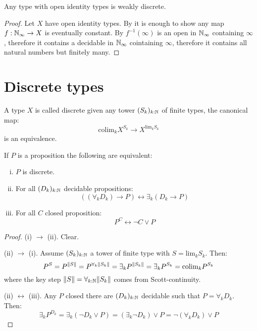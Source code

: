 \begin{lemma}
Any type with open identity types is weakly discrete.
\end{lemma}

\begin{proof}
Let $X$ have open identity types. By  it is enough to show any map $f:\mathbb{N}_{\infty}\to X$ is eventually constant. By $f^{-1}(\infty)$ is an open in $\mathbb{N}_{\infty}$ containing $\infty$, therefore it contains a decidable in $\mathbb{N}_{\infty}$ cointaining $\infty$, therefore it contains all natural numbers but finitely many.
\end{proof}


\section{Discrete types}

\begin{definition}
A type $X$ is called discrete given any tower $(S_k)_{k:\mathbb{N}}$ of finite types, the canonical map:
\[\mathrm{colim}_kX^{S_k} \to X^{\mathrm{lim}_kS_k}\]
is an equivalence.
\end{definition}

\begin{lemma}
If $P$ is a proposition the following are equivalent:
\begin{enumerate}[(i)]
\item $P$ is discrete.
\item For all $(D_k)_{k:\mathbb{N}}$ decidable propositions:
\[((\forall_kD_k)\to P) \leftrightarrow \exists_k(D_k\to P)\]
\item For all $C$ closed proposition:
\[P^C \leftrightarrow \neg C\lor P\]
\end{enumerate}
\end{lemma}

\begin{proof}
(i) $\to$ (ii). Clear.

(ii) $\to$ (i). Assume $(S_k)_{k:\mathbb{N}}$ a tower of finite type with $S=\mathrm{lim}_kS_k$. Then:
\[P^S = P^{\lVert S \rVert} = P^{\forall_{k}\lVert S_k \rVert} = \exists_{k} P^{\lVert S_k \rVert} = \exists_{k} P^{S_k} = \mathrm{colim}_kP^{S_k}\]
where the key step $\lVert S \rVert = \forall_{k:\mathbb{N}}\lVert S_k \rVert$ comes from Scott-continuity.

(ii) $\leftrightarrow$ (iii). Any $P$ closed there are $(D_k)_{k:\mathbb{N}}$ decidable such that $P = \forall_kD_k$. Then:
\[\exists_k P^{D_k} = \exists_k (\neg D_k\lor P) = (\exists_k\neg D_k)\lor P = \neg (\forall_kD_k)\lor P\] 
\end{proof}

